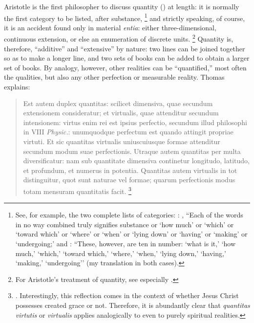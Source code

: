 Aristotle is the first philosopher to discuss quantity () at length: it is normally the first category to be listed, after substance,%
%
\footnote{See, for example, the two complete lists of categories: \cite[I, 1b25-2a4]{aristotle:categories}: , ``Each of the words in no way combined truly signifies substance or `how much' or `which' or `toward which' or `where' or `when' or `lying down' or `having' or `making' or `undergoing;' and \cite[, 9, 103b23--24]{aristotle:topics}:  ``These, however, are ten in number: `what is it,' `how much,' `which,' `toward which,' `where,' `when,' `lying down,' `having,' `making,' `undergoing'' (my translation in both cases).}
%
and strictly speaking, of course, it is an accident found only in material \emph{entia}: either three-dimensional, continuous extension, or else an enumeration of discrete units.%
%
\footnote{For Aristotle's treatment of quantity, see especially \cite[, 4b20-2a35]{aristotle:categories}.}
%
Quantity is, therefore, ``additive'' and ``extensive'' by nature: two lines can be joined together so as to make a longer line, and two sets of books can be added to obtain a larger set of books. By analogy, however, other realities can be ``quantified,'' most often the qualities, but also any other perfection or measurable reality. Thomas explains:
\begin{quotation}
Est autem duplex quantitas: scilicet dimensiva, quae secundum extensionem consideratur; et virtualis, quae attenditur secundum intensionem: virtus enim rei est ipsius perfectio, secundum illud philosophi in VIII \emph{Physic.}: unumquodque perfectum est quando attingit propriae virtuti. Et sic quantitas virtualis uniuscuiusque formae attenditur secundum modum suae perfectionis. Utraque autem quantitas per multa diversificatur: nam sub quantitate dimensiva continetur longitudo, latitudo, et profundum, et numerus in potentia. Quantitas autem virtualis in tot distinguitur, quot sunt naturae vel formae; quarum perfectionis modus totam mensuram quantitatis facit.%
%
\footnote{\Cite[29, 3]{st:deveritate}. Interestingly, this reflection comes in the context of whether Jesus Christ possesses created grace or not. Therefore, it is abundantly clear that \emph{quantitas virtutis} or \emph{virtualis} applies analogically to even to purely spiritual realities.}
\end{quotation}
